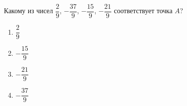  
\begin{ex}
	Какому из чисел $\dfrac{2}{9}$, $-\dfrac{37}{9}$, $-\dfrac{15}{9}$, $-\dfrac{21}{9}$ соответствует точка $A$?
	
	\selectanswer
	\begin{multicols}{4}
		\begin{enumerate}[label=\arabic*)]
			\item $\dfrac{2}{9}$
			\item $-\dfrac{15}{9}$
			\item $-\dfrac{21}{9}$
			\item $-\dfrac{37}{9}$
		\end{enumerate}
	\end{multicols}
\end{ex}